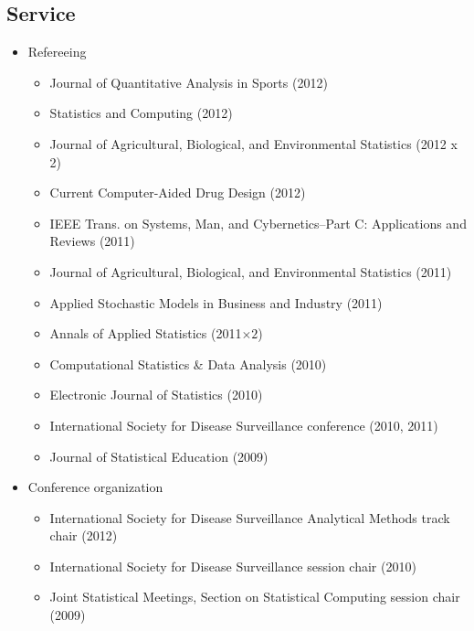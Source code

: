 \documentclass[overlapped,line,letterpaper]{res}
\begin{document}
\begin{resume}
\section{\bf Service}


\begin{itemize}
\item Refereeing
 \begin{itemize}
 \item Journal of Quantitative Analysis in Sports (2012)
 \item Statistics and Computing (2012)
 \item Journal of Agricultural, Biological, and Environmental Statistics (2012 x 2)
 \item Current Computer-Aided Drug Design (2012)
 \item IEEE Trans. on Systems, Man, and Cybernetics--Part C: Applications and Reviews (2011)
 \item Journal of Agricultural, Biological, and Environmental Statistics (2011)
 \item Applied Stochastic Models in Business and Industry (2011)
 \item Annals of Applied Statistics  (2011$\times 2$)
 \item Computational Statistics \& Data Analysis (2010)
 \item Electronic Journal of Statistics (2010)
 \item International Society for Disease Surveillance conference (2010, 2011)
 \item Journal of Statistical Education (2009)
 \end{itemize}
\item Conference organization
 \begin{itemize}
 \item International Society for Disease Surveillance Analytical Methods track chair (2012)
 \item International Society for Disease Surveillance session chair (2010)
 \item Joint Statistical Meetings, Section on Statistical Computing session chair (2009)
 \end{itemize}



\end{itemize}
\end{resume}
\end{document}

